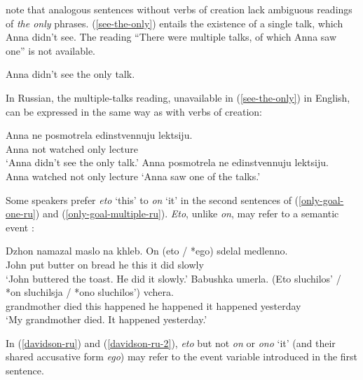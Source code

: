 \documentclass{article}
\begin{document}
\citeauthor{cb2015} note that analogous sentences without verbs of creation lack ambiguous readings of \textit{the only} phrases. (\ref{see-the-only}) entails the existence of a single talk, which Anna didn't see. The reading ``There were multiple talks, of which Anna saw one'' is not available.

\begin{exe}
	\ex \label{see-the-only} Anna didn't see the only talk.
\end{exe}

In Russian, the multiple-talks reading, unavailable in (\ref{see-the-only}) in English, can be expressed in the same way as with verbs of creation:

\begin{exe}
	\ex \begin{xlist}
		\ex \gll Anna ne posmotrela edinstvennuju lektsiju.\\
		Anna not watched only lecture\\
		\glt `Anna didn't see the only talk.'
		\ex Anna posmotrela ne edinstvennuju lektsiju.\\
		Anna watched not only lecture
		\glt `Anna saw one of the talks.'
	\end{xlist}
\end{exe}

Some speakers prefer \textit{eto} `this' to \textit{on} `it' in the second sentences of (\ref{only-goal-one-ru}) and (\ref{only-goal-multiple-ru}). \textit{Eto}, unlike \textit{on}, may refer to a semantic event \citep{davidson67}:

\begin{exe}
	\ex \label{davidson-ru} \gll Dzhon namazal maslo na khleb. On (eto / *ego) sdelal medlenno.\\
	John put butter on bread he this {} it did slowly\\
	\glt `John buttered the toast. He did it slowly.'
	\ex \label{davidson-ru-2} \gll Babushka umerla. (Eto sluchilos' / *on sluchilsja / *ono sluchilos') vchera.\\
	grandmother died this happened {} he happened {} it happened yesterday \\
	\glt `My grandmother died. It happened yesterday.'
\end{exe}

In (\ref{davidson-ru}) and (\ref{davidson-ru-2}), \textit{eto} but not \textit{on} or \textit{ono} `it' (and their shared accusative form \textit{ego}) may refer to the event variable introduced in the first sentence.
\end{document}
